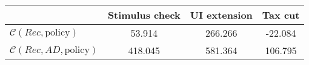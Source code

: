 \begin{tabular}{@{}lccc@{}} 
\toprule 
                          & Stimulus check      & UI extension    & Tax cut    \\  \midrule 
$\mathcal{C}(Rec,\text{policy})$ & 53.914  & 266.266  & -22.084     \\ 
$\mathcal{C}(Rec, AD,\text{policy})$ & 418.045  & 581.364  & 106.795     \\ 
\end{tabular}  
